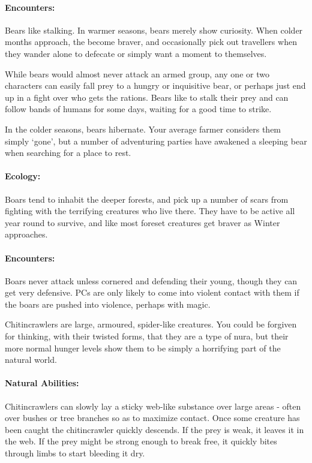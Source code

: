 \paragraph{Encounters:} Bears like stalking.  In warmer seasons, bears merely show curiosity.  When colder months approach, the become braver, and occasionally pick out travellers when they wander alone to defecate or simply want a moment to themselves.

While bears would almost never attack an armed group, any one or two characters can easily fall prey to a hungry or inquisitive bear, or perhaps just end up in a fight over who gets the rations.  Bears like to stalk their prey and can follow bands of humans for some days, waiting for a good time to strike.

In the colder seasons, bears hibernate.  Your average farmer considers them simply `gone', but a number of adventuring parties have awakened a sleeping bear when searching for a place to rest.

\label{boar}
\boar

\paragraph{Ecology:} Boars tend to inhabit the deeper forests, and pick up a number of scars from fighting with the terrifying creatures who live there.  They have to be active all year round to survive, and like most foreset creatures get braver as Winter approaches.

\paragraph{Encounters:} Boars never attack unless cornered and defending their young, though they can get very defensive.  PCs are only likely to come into violent contact with them if the boars are pushed into violence, perhaps with magic.

\label{chitincrawler}
\chitincrawler

Chitincrawlers are large, armoured, spider-like creatures.  You could be forgiven for thinking, with their twisted forms, that they are a type of nura, but their more normal hunger levels show them to be simply a horrifying part of the natural world.

\paragraph{Natural Abilities:} Chitincrawlers can slowly lay a sticky web-like substance over large areas - often over bushes or tree branches so as to maximize contact.  Once some creature has been caught the chitincrawler quickly descends.  If the prey is weak, it leaves it in the web.  If the prey might be strong enough to break free, it quickly bites through limbs to start bleeding it dry.

